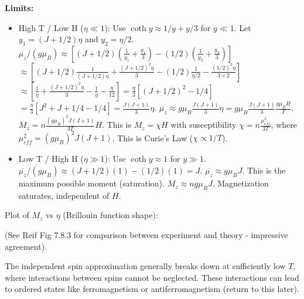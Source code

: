 \documentclass[11pt]{article}
\newcommand{\avg}[1]{\overline{#1}}
\newcommand{\muB}{\mu_B} %
\begin{document}
\textbf{Limits:}
\begin{itemize}
    \item High T / Low H ($\eta \ll 1$): Use $\coth y \approx 1/y + y/3$ for $y \ll 1$.
    Let $y_1 = (J+1/2)\eta$ and $y_2 = \eta/2$.
    $\avg{\mu_z} / (g\muB) \approx [ (J+1/2) (\frac{1}{y_1} + \frac{y_1}{3}) - (1/2) (\frac{1}{y_2} + \frac{y_2}{3}) ]$
    $\approx [ (J+1/2)\frac{1}{(J+1/2)\eta} + \frac{(J+1/2)^2 \eta}{3} - (1/2)\frac{1}{\eta/2} - \frac{(1/2)^2 \eta}{3 \times 2} ]$
    $\approx [ \frac{1}{\eta} + \frac{(J+1/2)^2 \eta}{3} - \frac{1}{\eta} - \frac{\eta}{12} ] = \frac{\eta}{3} [(J+1/2)^2 - 1/4]$
    $= \frac{\eta}{3} [J^2 + J + 1/4 - 1/4] = \frac{J(J+1)}{3} \eta$.
    $\avg{\mu_z} \approx g \muB \frac{J(J+1)}{3} \eta = g \muB \frac{J(J+1)}{3} \frac{g\muB H}{T}$.
    $M_z = n \frac{(g\muB)^2 J(J+1)}{3T} H$.
    This is $M_z = \chi H$ with susceptibility $\chi = n \frac{\mu_{eff}^2}{3T}$, where $\mu_{eff}^2 = (g\muB)^2 J(J+1)$. This is Curie's Law ($\chi \propto 1/T$).

    \item Low T / High H ($\eta \gg 1$): Use $\coth y \approx 1$ for $y \gg 1$.
    $\avg{\mu_z} / (g\muB) \approx (J+1/2)(1) - (1/2)(1) = J$.
    $\avg{\mu_z} \approx g \muB J$. This is the maximum possible moment (saturation).
    $M_z \approx n g \muB J$. Magnetization saturates, independent of $H$.
\end{itemize}

Plot of $M_z$ vs $\eta$ (Brillouin function shape):
\begin{center}
\end{center}
(See Reif Fig 7.8.3 for comparison between experiment and theory - impressive agreement).

The independent spin approximation generally breaks down at sufficiently low $T$, where interactions between spins cannot be neglected. These interactions can lead to ordered states like ferromagnetism or antiferromagnetism (return to this later).
\end{document}
